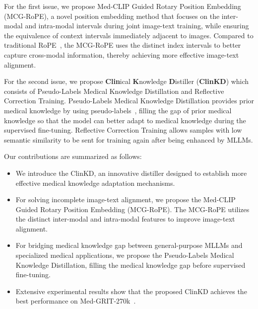 For the first issue, we propose Med-CLIP Guided Rotary Position Embedding (MCG-RoPE), a novel position embedding method that focuses on the inter-modal and intra-modal intervals during joint image-text training, while ensuring the equivalence of context intervals immediately adjacent to images. Compared to traditional RoPE~\cite{su2023roformerenhancedtransformerrotary}, the MCG-RoPE uses the distinct index intervals to better capture cross-modal information, thereby achieving more effective image-text alignment.

For the second issue, we propose \textbf{Clin}ical \textbf{K}nowledge \textbf{D}istiller (\textbf{ClinKD}) which consists of Pseudo-Labels Medical Knowledge Distillation and Reflective Correction Training. Pseudo-Labels Medical Knowledge Distillation provides prior medical knowledge by using pseudo-labels~\cite{pseudolabels, chen2023mixedpseudolabelssemisupervised}, filling the gap of prior medical knowledge so that the model can better adapt to medical knowledge during the supervised fine-tuning. Reflective Correction Training allows samples with low semantic similarity to be sent for training again after being enhanced by MLLMs.

Our contributions are summarized as follows:  
\begin{itemize}
    \item We introduce the ClinKD, an innovative distiller designed to establish more effective medical knowledge adaptation mechanisms.
    \item For solving incomplete
image-text alignment, we propose the Med-CLIP Guided Rotary Position Embedding (MCG-RoPE). The MCG-RoPE utilizes the distinct inter-modal and intra-modal features to improve image-text alignment.
    \item For bridging medical knowledge gap
between general-purpose MLLMs and specialized medical
applications, we propose the Pseudo-Labels Medical Knowledge Distillation, filling the medical knowledge gap before supervised fine-tuning. 
    \item Extensive experimental results show that the proposed ClinKD achieves the best performance on Med-GRIT-270k~\cite{huang2024BiRD}.
\end{itemize}


